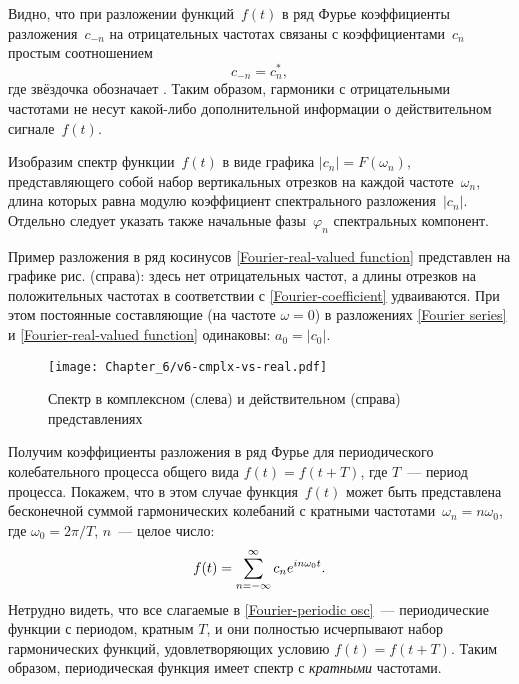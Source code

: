 Видно, что при разложении  функций~$f(t)$ в ряд Фурье
коэффициенты разложения~$c_{-n}$ на отрицательных
частотах связаны с коэффициентами~$c_n$ простым соотношением
\begin{equation*}
c_{-n}=c_{n}^*,
\end{equation*}
где звёздочка обозначает .
Таким образом, гармоники с отрицательными частотами не несут какой-либо
дополнительной информации о действительном сигнале~$f(t)$.

Изобразим спектр функции~$f(t)$ в виде графика $|c_n|=F(\omega_n)$, 
представляющего собой набор вертикальных отрезков на каждой частоте~$\omega_n$, 
длина которых равна модулю коэффициент спектрального разложения~$|c_n|$.
Отдельно следует указать также начальные фазы~$\varphi_n$ 
спектральных компонент.

Пример разложения в ряд косинусов \eqref{Fourier-real-valued function} 
представлен на графике рис.  (справа): здесь нет
отрицательных частот, а длины отрезков на положительных частотах в соответствии с
\eqref{Fourier-coefficient} удваиваются. При этом постоянные составляющие
(на частоте $\omega=0$) в разложениях \eqref{Fourier series} и
\eqref{Fourier-real-valued function} одинаковы: $a_0=|c_0|$.

\begin{figure}[ht]
    \centering\texttt{[image: Chapter\_6/v6-cmplx-vs-real.pdf]}
    \caption{Спектр в комплексном (слева) и действительном (справа) представлениях}
\end{figure}

\label{sec:spectrum-periodic}
Получим коэффициенты разложения в ряд Фурье для периодического колебательного
процесса общего вида $f(t)=f(t+T)$, где $T$~--- период процесса.
Покажем, что в этом случае функция~$f(t)$ может быть представлена
бесконечной суммой гармонических колебаний с кратными частотами~$\omega_n=n\omega_0$,
где $\omega_0=2\pi/T$, $n$~--- целое число:
\begin{equation}
    \eqmark{Fourier-periodic osc}
    f(t)=\sum_{n=-\infty}^{\infty} c_n e^{in\omega_0 t}.
\end{equation}
Нетрудно видеть, что все слагаемые в \eqref{Fourier-periodic osc}~---
периодические функции с периодом, кратным $T$, и они полностью исчерпывают
набор гармонических функций, удовлетворяющих условию $f(t)=f(t+T)$.
Таким образом, периодическая функция имеет 
спектр с \emph{кратными} частотами.

